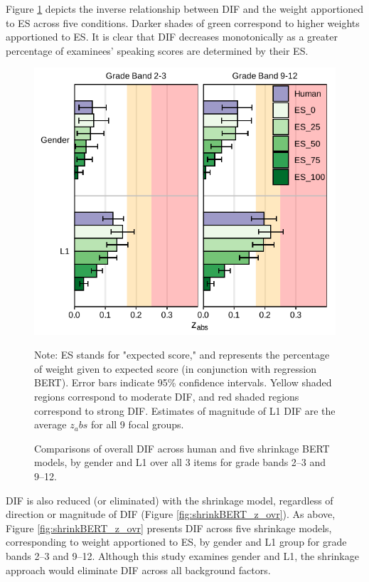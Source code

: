 \documentclass [PhD] {uclathes}
\begin{document}
Figure \ref{fig:shrinkBERT_zabs_ovr} depicts the inverse relationship between DIF and the weight apportioned to ES across five conditions. Darker shades of green correspond to higher weights apportioned to ES. It is clear that DIF decreases monotonically as a greater percentage of examinees’ speaking scores are determined by their ES. 

\begin{figure}[h]
    \centering
    \caption{Comparisons of overall DIF across human and five shrinkage BERT models, by gender and L1 over all 3 items for grade bands 2–3 and 9–12.}    
    \includegraphics[width=4.5in]{figures/20230425_ETS-DIF_ES_zabs_ovr_edit.pdf}
    \label{fig:shrinkBERT_zabs_ovr}
	{\newline Note: ES stands for "expected score," and represents the percentage of weight given to expected score (in conjunction with regression BERT). Error bars indicate 95\% confidence intervals. Yellow shaded regions correspond to moderate DIF, and red shaded regions correspond to strong DIF. Estimates of magnitude of L1 DIF are the average $z_abs$ for all 9 focal groups. \par}
\end{figure}

DIF is also reduced (or eliminated) with the shrinkage model, regardless of direction or magnitude of DIF (Figure \ref{fig:shrinkBERT_z_ovr}). As above, Figure \ref{fig:shrinkBERT_z_ovr} presents DIF across five shrinkage models, corresponding to weight apportioned to ES, by gender and L1 group for grade bands 2–3 and 9–12. Although this study examines gender and L1, the shrinkage approach would eliminate DIF across all background factors. 
\end{document}
